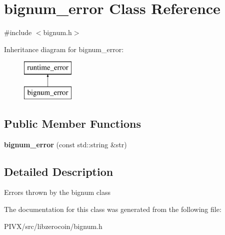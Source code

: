 \hypertarget{classbignum__error}{}\section{bignum\+\_\+error Class Reference}
\label{classbignum__error}


{\ttfamily \#include $<$bignum.\+h$>$}

Inheritance diagram for bignum\+\_\+error\+:\begin{figure}[H]
\begin{center}
\leavevmode
\includegraphics[height=2.000000cm]{classbignum__error}
\end{center}
\end{figure}
\subsection*{Public Member Functions}
\begin{DoxyCompactItemize}
\item 
\mbox{\label{classbignum__error_a500a3bab949914c4d3202cbb9241f10f}} 
{\bfseries bignum\+\_\+error} (const std\+::string \&str)
\end{DoxyCompactItemize}


\subsection{Detailed Description}
Errors thrown by the bignum class 

The documentation for this class was generated from the following file\+:\begin{DoxyCompactItemize}
\item 
P\+I\+V\+X/src/libzerocoin/bignum.\+h\end{DoxyCompactItemize}
